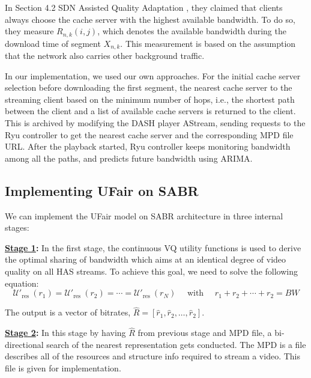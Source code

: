 \documentclass[12pt]{article}
\begin{document}
In Section 4.2 SDN Assisted Quality Adaptation \cite{bhat_network_2017}, they claimed that clients always choose the cache server with the highest available bandwidth. To do so, they measure $R_{n,k}(i,j)$, which denotes the available bandwidth during the download time of segment $X_{n,k}$. This measurement is based on the assumption that the network also carries other background traffic. 

In our implementation, we used our own approaches. For the initial cache server selection before downloading the first segment, the nearest cache server to the streaming client based on the minimum number of hops, i.e., the shortest path between the client and a list of available cache servers is returned to the client. This is archived by modifying the DASH player AStream, sending requests to the Ryu controller to get the nearest cache server and the corresponding MPD file URL. After the playback started, Ryu controller keeps monitoring bandwidth among all the paths, and predicts future bandwidth using ARIMA. 



\subsection{Implementing UFair on SABR}
We can implement the UFair model on SABR architecture in three internal stages:

\textbf{\underline{Stage 1}:} In the first stage, the continuous VQ utility functions is used to derive the optimal sharing of bandwidth which aims at an identical degree of video quality on all HAS streams. To achieve this goal, we need to solve the following equation:
\begin{equation}
\mathcal{U\prime}_{\text {res }}\left(r_{1}\right)=\mathcal{U\prime}_{\text {res }}\left(r_{2}\right)=\cdots=\mathcal{U\prime}_{\text {res }}\left(r_{N}\right) \quad \text { with } \quad r_{1}+r_{2}+\cdots+r_{2}=B W
\end{equation}

The output is a vector of bitrates, $\hat{R}=\left[\hat{r}_{1}, \hat{r}_{2}, \ldots, \hat{r}_{2}\right]$.

\textbf{\underline{Stage 2}:} In this stage by having $\hat{R}$ from previous stage and MPD file, a bi-directional search of the nearest representation gets conducted. The MPD is a file describes all of the resources and structure info required to stream a video. This file is given for implementation.
\end{document}
